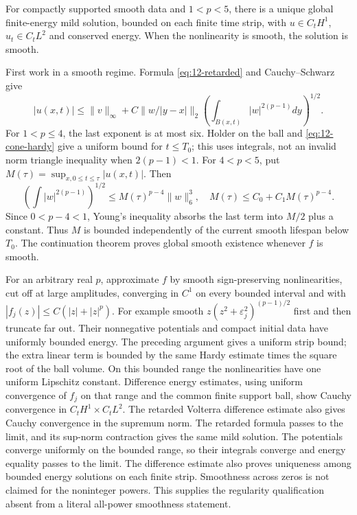 \begin{theorem}
For compactly supported smooth data and $1<p<5$, there is a unique
global finite-energy mild solution, bounded on each finite time
strip, with $u\in C_tH^1$, $u_t\in C_tL^2$ and conserved energy.
When the nonlinearity is smooth, the solution is smooth.
\end{theorem}
\begin{expandedproof}
First work in a smooth regime. Formula \eqref{eq:12-retarded} and
Cauchy--Schwarz give
\[
 |u(x,t)|\le\|v\|_\infty+C
 \|w/|y-x|\|_2\left(\int_{B(x,t)}|w|^{2(p-1)}dy\right)^{1/2}.
\]
For $1<p\le4$, the last exponent is at most six. Holder on the ball
and \eqref{eq:12-cone-hardy} give a uniform bound for $t\le T_0$;
this uses integrals, not an invalid norm triangle inequality when
$2(p-1)<1$. For $4<p<5$, put
$M(\tau)=\sup_{x,0\le t\le\tau}|u(x,t)|$. Then
\[
 \left(\int|w|^{2(p-1)}\right)^{1/2}
 \le M(\tau)^{p-4}\|w\|_6^3,
 \quad M(\tau)\le C_0+C_1M(\tau)^{p-4}.
\]
Since $0<p-4<1$, Young's inequality absorbs the last term into
$M/2$ plus a constant. Thus $M$ is bounded independently of the
current smooth lifespan below $T_0$. The continuation theorem
proves global smooth existence whenever $f$ is smooth.

For an arbitrary real $p$, approximate $f$ by smooth sign-preserving
nonlinearities, cut off at large amplitudes, converging in $C^1$
on every bounded interval and with
$|f_j(z)|\le C(|z|+|z|^p)$. For example smooth
$z(z^2+\varepsilon_j^2)^{(p-1)/2}$ first and then truncate far out.
Their nonnegative potentials and compact initial data have uniformly
bounded energy. The preceding argument gives a uniform strip bound;
the extra linear term is bounded by the same Hardy estimate times
the square root of the ball volume. On this bounded range the
nonlinearities have one uniform Lipschitz constant. Difference energy
estimates, using uniform convergence of $f_j$ on that range and the
common finite support ball, show Cauchy convergence in
$C_tH^1\times C_tL^2$. The retarded Volterra difference estimate
also gives Cauchy convergence in the supremum norm.
The retarded formula passes to the limit,
and its sup-norm contraction gives the same mild solution. The
potentials converge uniformly on the bounded range, so their integrals
converge and energy equality passes to the limit. The difference
estimate also proves uniqueness among bounded energy solutions on
each finite strip. Smoothness across zeros is not claimed for the
noninteger powers. This supplies the regularity qualification absent
from a literal all-power smoothness statement.
\end{expandedproof}
